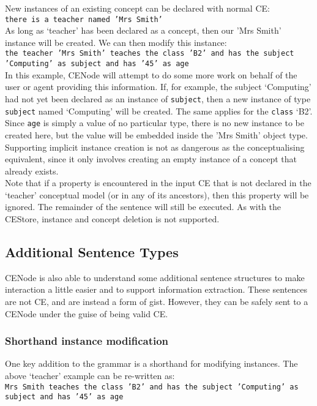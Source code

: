 \documentclass{scrartcl}
\begin{document}
New instances of an existing concept can be declared with normal CE:\\
\texttt{there is a teacher named 'Mrs Smith'}\\

As long as `teacher' has been declared as a concept, then our 'Mrs Smith' instance will be created. We can then modify this instance:\\
\texttt{the teacher 'Mrs Smith' teaches the class 'B2' and has the subject 'Computing' as subject and has '45' as age}\\

In this example, CENode will attempt to do some more work on behalf of the user or agent providing this information. If, for example, the subject `Computing' had not yet been declared as an instance of \texttt{subject}, then a new instance of type \texttt{subject} named `Computing' will be created. The same applies for the \texttt{class} `B2'. Since \texttt{age} is simply a value of no particular type, there is no new instance to be created here, but the value will be embedded inside the 'Mrs Smith' object type. Supporting implicit instance creation is not as dangerous as the conceptualising equivalent, since it only involves creating an empty instance of a concept that already exists.\\

Note that if a property is encountered in the input CE that is not declared in the `teacher' conceptual model (or in any of its ancestors), then this property will be ignored. The remainder of the sentence will still be executed. As with the CEStore, instance and concept deletion is not supported.\\

\subsection{Additional Sentence Types}
CENode is also able to understand some additional sentence structures to make interaction a little easier and to support information extraction. These sentences are not CE, and are instead a form of gist. However, they can be safely sent to a CENode under the guise of being valid CE.\\


\subsubsection{Shorthand instance modification}

One key addition to the grammar is a shorthand for modifying instances. The above `teacher' example can be re-written as:\\
\texttt{Mrs Smith teaches the class 'B2' and has the subject 'Computing' as subject and has '45' as age}\\
\end{document}
